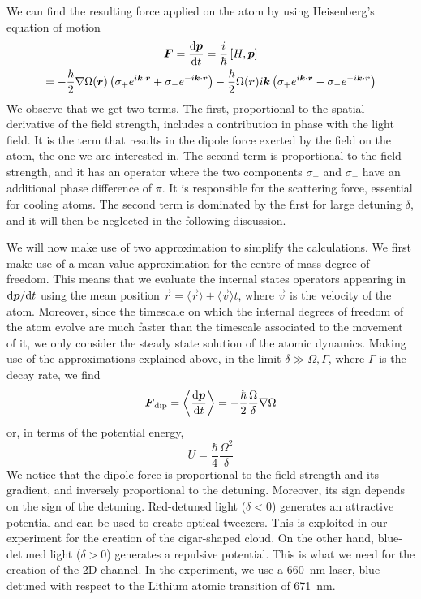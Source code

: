 We can find the resulting force applied on the atom by using Heisenberg's equation of motion
\begin{multline}
    \vec{F} = \frac{\differential\vec{p}}{\differential t} = \frac{i}{\hbar} \left[ H, \vec{p} \right] \\= - \frac{\hbar}{2} \nabla \Omega(\vec{r}) \left( \sigma_+ e^{i\vec{k}\cdot \vec{r}} +  \sigma_{-} e^{-i\vec{k}\cdot \vec{r} } \right) - \frac{\hbar
    }{2} \Omega(\vec{r}) i \vec{k} \left( \sigma_+ e^{i\vec{k}\cdot \vec{r}} -  \sigma_{-} e^{-i\vec{k}\cdot \vec{r} } \right)
\end{multline}
We observe that we get two terms. The first, proportional to the spatial derivative of the field strength, includes a contribution in phase with the light field. It is the term that results in the dipole force exerted by the field on the atom, the one we are interested in. The second term is proportional to the field strength, and it has an operator where the two components $\sigma_+$ and $\sigma_-$ have an additional phase difference of $\pi$. It is responsible for the scattering force, essential for cooling atoms. The second term is dominated  by the first for large detuning $\delta$, and it will then be neglected in the following discussion.

We will now make use of two approximation to simplify the calculations. We first make use of a mean-value approximation for the centre-of-mass degree of freedom. This means that we evaluate the internal states operators appearing in $\differential \vec{p} / \differential t$ using the mean position $\vec{r} = \langle \vec{r} \rangle + \langle \vec{v} \rangle t$, where $\vec{v}$ is the velocity of the atom. Moreover, since the timescale on which the internal degrees of freedom of the atom evolve are much faster than the timescale associated to the movement of it, we only consider the steady state solution of the atomic dynamics.
Making use of the approximations explained above, in the limit $\delta  \gg \Omega, \Gamma$, where $\Gamma$ is the decay rate, we find
\begin{equation}
    \vec{F}_\text{dip} = \left\langle \frac{\differential \vec{p}}{\differential t} \right\rangle = - \frac{\hbar}{2} \frac{\Omega}{\delta} \nabla \Omega
\end{equation}
or, in terms of the potential energy,
\begin{equation}
    U = \frac{\hbar}{4}\frac{\Omega^2}{\delta}
\end{equation}
We notice that the dipole force is proportional to the field strength and its gradient, and inversely proportional to the detuning. Moreover, its sign depends on the sign of the detuning. Red-detuned light ($\delta < 0$) generates an attractive potential and can be used to create optical tweezers. This is exploited in our experiment for the creation of the cigar-shaped cloud. On the other hand, blue-detuned light ($\delta > 0$) generates a repulsive potential. This is what we need for the creation of the 2D channel. In the experiment, we use a \SI{660}{nm} laser, blue-detuned with respect to the Lithium atomic transition of \SI{671}{nm}.

